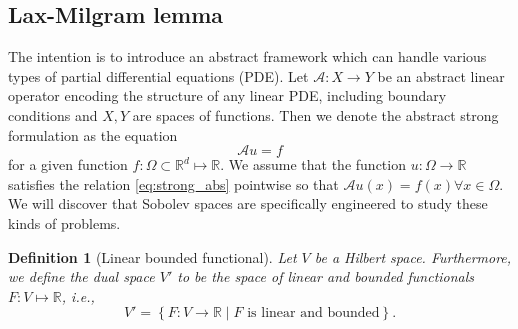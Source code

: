 \documentclass[11pt]{article}
\newtheorem{definition}[theorem]{Definition}
\theoremstyle{remark}
\newcommand{\abs}[1]{\left\lvert #1 \right\rvert}
\numberwithin{equation}{section}
\begin{document}




\subsection{Lax-Milgram lemma}%
\label{sub:lax_milgram_lemma}

The intention is to introduce an abstract framework which can handle various types of partial differential equations (PDE). Let  $\mathcal{A} : X \to Y $ be an abstract linear operator encoding the structure of any linear PDE, including boundary
conditions and $X,Y$ are spaces of functions. Then we denote the abstract strong formulation as the equation
\begin{equation}
\label{eq:strong_abs}
\mathcal{A} u = f
\end{equation}
for a given function $f: \Omega \subset \mathbb{R}^d \mapsto \mathbb{R}$. We assume that the function $u: \Omega \rightarrow \mathbb{R}$ satisfies the relation \eqref{eq:strong_abs} pointwise so that $\mathcal{A} u(x)=f(x) \forall x \in \Omega$.
We will discover that Sobolev spaces are specifically engineered to study these kinds of problems.

\begin{definition}[Linear bounded functional]
    \label{def:linear_function}
Let $V$ be a Hilbert space. Furthermore, we define the dual space $V' $ to be the space of linear and bounded functionals $F: V  \mapsto \mathbb{R} $, i.e.,
\begin{equation}
V'  = \left\{ F: V \to \mathbb{R}   \mid  F \text{ is linear and bounded} \right\}.
\end{equation}
\end{definition}
\end{document}
